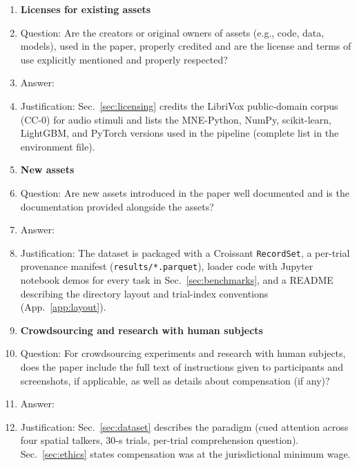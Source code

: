 \begin{enumerate}
\item {\bf Licenses for existing assets}
    \item[] Question: Are the creators or original owners of assets (e.g., code, data, models), used in the paper, properly credited and are the license and terms of use explicitly mentioned and properly respected?
    \item[] Answer: \answerYes{}
    \item[] Justification: Sec.~\ref{sec:licensing} credits the LibriVox public-domain corpus (CC-0) for audio stimuli and lists the MNE-Python, NumPy, scikit-learn, LightGBM, and PyTorch versions used in the pipeline (complete list in the environment file). 

\item {\bf New assets}
    \item[] Question: Are new assets introduced in the paper well documented and is the documentation provided alongside the assets?
    \item[] Answer: \answerYes{}
    \item[] Justification: The dataset is packaged with a Croissant \texttt{RecordSet}, a per-trial provenance manifest (\texttt{results/*.parquet}), loader code with Jupyter notebook demos for every task in Sec.~\ref{sec:benchmarks}, and a README describing the directory layout and trial-index conventions (App.~\ref{app:layout}).

\item {\bf Crowdsourcing and research with human subjects}
    \item[] Question: For crowdsourcing experiments and research with human subjects, does the paper include the full text of instructions given to participants and screenshots, if applicable, as well as details about compensation (if any)?
    \item[] Answer: \answerYes{}
    \item[] Justification: Sec.~\ref{sec:dataset} describes the paradigm (cued attention across four spatial talkers, 30-s trials, per-trial comprehension question). Sec.~\ref{sec:ethics} states compensation was at the jurisdictional minimum wage. 


\end{enumerate}
